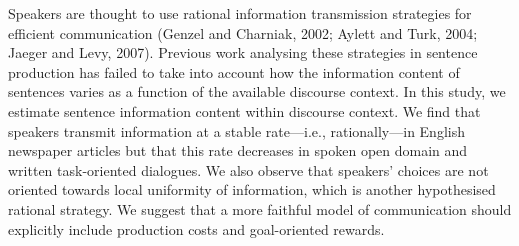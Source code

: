 Speakers are thought to use rational information transmission strategies for efficient communication (Genzel and Charniak, 2002; Aylett and Turk, 2004; Jaeger and Levy, 2007). Previous work analysing these strategies in sentence production has failed to take into account how the information content of sentences varies as a function of the available discourse context. In this study, we estimate sentence information content within discourse context. We find that speakers transmit information at a stable rate---i.e., rationally---in English newspaper articles but that this rate decreases in spoken open domain and written task-oriented dialogues. We also observe that speakers' choices are not oriented towards local uniformity of information, which is another hypothesised rational strategy. We suggest that a more faithful model of communication should explicitly include production costs and goal-oriented rewards.
